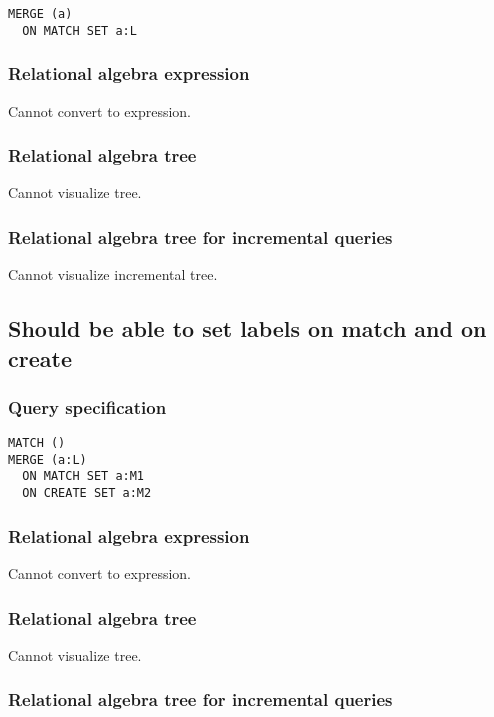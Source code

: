\begin{lstlisting}
MERGE (a)
  ON MATCH SET a:L
\end{lstlisting}

\subsubsection*{Relational algebra expression}

Cannot convert to expression.

\subsubsection*{Relational algebra tree}

Cannot visualize tree.

\subsubsection*{Relational algebra tree for incremental queries}

Cannot visualize incremental tree.

\subsection{Should be able to set labels on match and on create}

\subsubsection*{Query specification}

\begin{lstlisting}
MATCH ()
MERGE (a:L)
  ON MATCH SET a:M1
  ON CREATE SET a:M2
\end{lstlisting}

\subsubsection*{Relational algebra expression}

Cannot convert to expression.

\subsubsection*{Relational algebra tree}

Cannot visualize tree.

\subsubsection*{Relational algebra tree for incremental queries}

